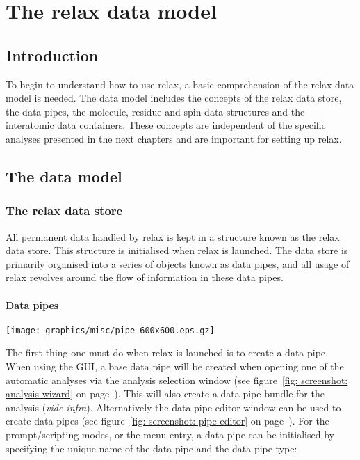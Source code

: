 
\chapter{The relax data model} \label{ch: data model}



\section{Introduction}

To begin to understand how to use relax, a basic comprehension of the relax data model is needed.  The data model includes the concepts of the relax data store, the data pipes, the molecule, residue and spin data structures and the interatomic data containers.  These concepts are independent of the specific analyses presented in the next chapters and are important for setting up relax.




\section{The data model}



\subsection{The relax data store}

All permanent data handled by relax is kept in a structure known as the relax data store.  This structure is initialised when relax is launched.  The data store is primarily organised into a series of objects known as data pipes, and all usage of relax revolves around the flow of information in these data pipes.


\subsubsection{Data pipes}

\begin{figure*}[h]
\texttt{[image: graphics/misc/pipe\_600x600.eps.gz]}
\end{figure*}

The first thing one must do when relax is launched is to create a data pipe.  When using the GUI, a base data pipe will be created when opening one of the automatic analyses via the analysis selection window (see figure~\ref{fig: screenshot: analysis wizard} on page~\pageref{fig: screenshot: analysis wizard}).  This will also create a data pipe bundle for the analysis (\textit{vide infra}).  Alternatively the data pipe editor window can be used to create data pipes (see figure~\ref{fig: screenshot: pipe editor} on page~\pageref{fig: screenshot: pipe editor}).  For the prompt/scripting modes, or the  menu entry, a data pipe can be initialised by specifying the unique name of the data pipe and the data pipe type:

